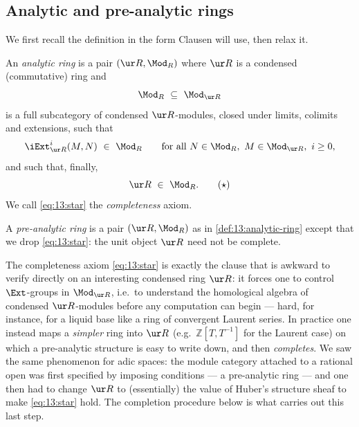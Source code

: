 \subsection{Analytic and pre-analytic rings}

We first recall the definition in the form Clausen will use, then relax it.

\begin{definition}
\label{def:13:analytic-ring}
An \emph{analytic ring} is a pair $(\ur R, \Mod_R)$ where $\ur R$ is a condensed
(commutative) ring and
\begin{equation*}
\Mod_R\ \subseteq\ \Mod_{\ur R}
\end{equation*}
is a full subcategory of condensed $\ur R$-modules, closed under limits,
colimits and extensions, such that
\begin{equation}
\label{eq:13:ext-axiom}
\iExt^{i}_{\ur R}(M,N)\ \in\ \Mod_R\qquad\text{for all }N\in\Mod_R,\ M\in\Mod_{\ur R},\ i\ge 0,
\end{equation}
and such that, finally,
\begin{equation*}
\label{eq:13:star}
\ur R\ \in\ \Mod_R.\tag{$\star$}
\end{equation*}
We call \eqref{eq:13:star} the \emph{completeness} axiom.
\end{definition}

\begin{definition}
\label{def:13:pre-analytic-ring}
A \emph{pre-analytic ring} is a pair $(\ur R, \Mod_R)$ as in
\cref{def:13:analytic-ring} except that we drop \eqref{eq:13:star}: the unit
object $\ur R$ need not be complete.
\end{definition}

\begin{remark}
\label{rmk:13:why-pre-analytic}
The completeness axiom \eqref{eq:13:star} is exactly the clause that is awkward
to verify directly on an interesting condensed ring $\ur R$: it forces one to
control $\Ext$-groups in $\Mod_{\ur R}$, i.e.\ to understand the homological
algebra of condensed $\ur R$-modules before any computation can begin --- hard,
for instance, for a liquid base like a ring of convergent Laurent series. In
practice one instead maps a \emph{simpler} ring into $\ur R$ (e.g.\
$\mathbb{Z}[T,T^{-1}]$ for the Laurent case) on which a pre-analytic structure is
easy to write down, and then \emph{completes}. We saw the same phenomenon for
adic spaces: the module category attached to a rational open was first specified
by imposing conditions --- a pre-analytic ring --- and one then had to change
$\ur R$ to (essentially) the value of Huber's structure sheaf to make
\eqref{eq:13:star} hold. The completion procedure below is what carries out this
last step.
\end{remark}

